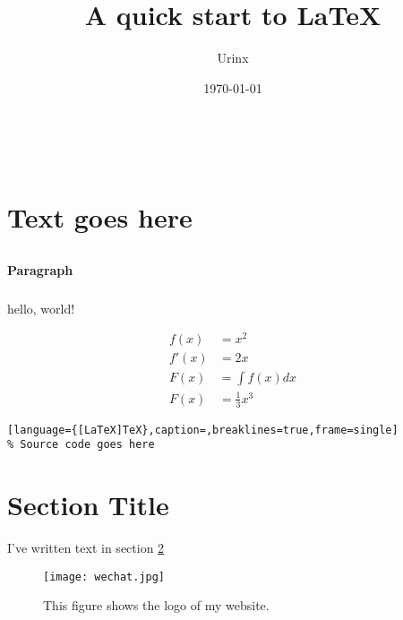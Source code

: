 \documentclass{article}
\begin{document}
\author{Urinx} %
\title{A quick start to \LaTeX{}} %
\date{\today{}} %
\maketitle{} %
\tableofcontents{} %

\\ %

\newpage{} %

\section{Text goes here} %
\subsection{}
\subsubsection{}
\paragraph{Paragraph} %
\subparagraph{}

hello, world!

\begin{align}
f(x) &= x^2\\
f'(x) &= 2x\\
F(x) &= \int f(x)dx\\
F(x) &= \frac{1}{3}x^3
\end{align}

\begin{lstlisting}[language={[LaTeX]TeX},caption=,breaklines=true,frame=single]
% Source code goes here
\end{lstlisting}

\section{Section Title}\label{sec:YOURLABEL}
I've written text in section \ref{sec:YOURLABEL}

\printbibliography

\begin{figure}
\texttt{[image: wechat.jpg]}
\caption{This figure shows the logo of my website.}
\end{figure}
\end{document}
